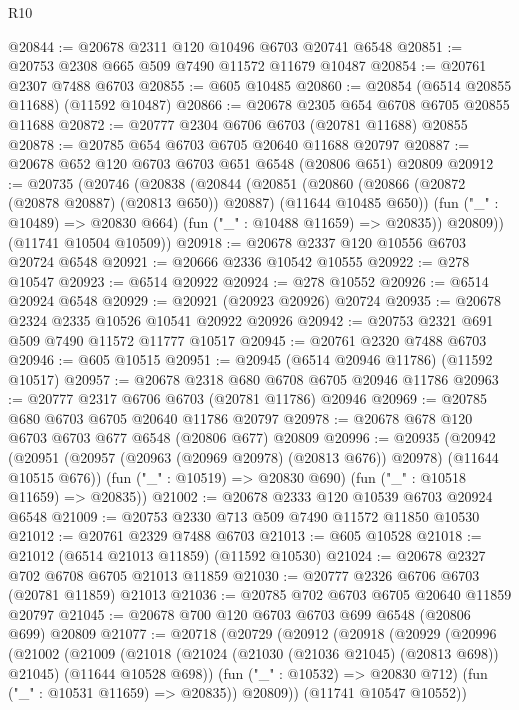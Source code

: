 \begin{lexlean}{R10}
\begin{coremodule}
@20844 := @20678 @2311 @120 @10496 @6703 @20741 @6548
@20851 := @20753 @2308 @665 @509 @7490 @11572 @11679 @10487
@20854 := @20761 @2307 @7488 @6703
@20855 := @605 @10485
@20860 := @20854 (@6514 @20855 @11688) (@11592 @10487)
@20866 := @20678 @2305 @654 @6708 @6705 @20855 @11688
@20872 := @20777 @2304 @6706 @6703 (@20781 @11688) @20855
@20878 := @20785 @654 @6703 @6705 @20640 @11688 @20797
@20887 := @20678 @652 @120 @6703 @6703 @651 @6548 (@20806 @651) @20809
@20912 := @20735
    (@20746
      (@20838
        (@20844
          (@20851
            (@20860 (@20866 (@20872 (@20878 @20887) (@20813 @650)) @20887) (@11644 @10485 @650))
            (fun ("_" : @10489) => @20830 @664)
            (fun ("_" : @10488 @11659) => @20835))
          @20809))
      (@11741 @10504 @10509))
@20918 := @20678 @2337 @120 @10556 @6703 @20724 @6548
@20921 := @20666 @2336 @10542 @10555
@20922 := @278 @10547
@20923 := @6514 @20922
@20924 := @278 @10552
@20926 := @6514 @20924 @6548
@20929 := @20921 (@20923 @20926) @20724
@20935 := @20678 @2324 @2335 @10526 @10541 @20922 @20926
@20942 := @20753 @2321 @691 @509 @7490 @11572 @11777 @10517
@20945 := @20761 @2320 @7488 @6703
@20946 := @605 @10515
@20951 := @20945 (@6514 @20946 @11786) (@11592 @10517)
@20957 := @20678 @2318 @680 @6708 @6705 @20946 @11786
@20963 := @20777 @2317 @6706 @6703 (@20781 @11786) @20946
@20969 := @20785 @680 @6703 @6705 @20640 @11786 @20797
@20978 := @20678 @678 @120 @6703 @6703 @677 @6548 (@20806 @677) @20809
@20996 := @20935
    (@20942
      (@20951 (@20957 (@20963 (@20969 @20978) (@20813 @676)) @20978) (@11644 @10515 @676))
      (fun ("_" : @10519) => @20830 @690)
      (fun ("_" : @10518 @11659) => @20835))
@21002 := @20678 @2333 @120 @10539 @6703 @20924 @6548
@21009 := @20753 @2330 @713 @509 @7490 @11572 @11850 @10530
@21012 := @20761 @2329 @7488 @6703
@21013 := @605 @10528
@21018 := @21012 (@6514 @21013 @11859) (@11592 @10530)
@21024 := @20678 @2327 @702 @6708 @6705 @21013 @11859
@21030 := @20777 @2326 @6706 @6703 (@20781 @11859) @21013
@21036 := @20785 @702 @6703 @6705 @20640 @11859 @20797
@21045 := @20678 @700 @120 @6703 @6703 @699 @6548 (@20806 @699) @20809
@21077 := @20718
    (@20729
      (@20912
        (@20918
          (@20929
            (@20996
              (@21002
                (@21009
                  (@21018
                    (@21024 (@21030 (@21036 @21045) (@20813 @698)) @21045)
                    (@11644 @10528 @698))
                  (fun ("_" : @10532) => @20830 @712)
                  (fun ("_" : @10531 @11659) => @20835))
                @20809))
            (@11741 @10547 @10552))

\end{coremodule}
\end{lexlean}
